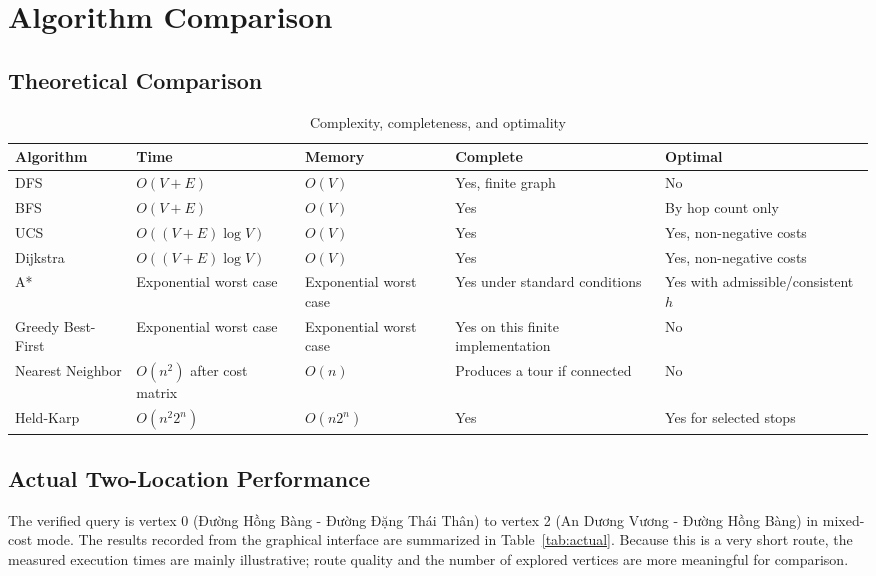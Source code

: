 \documentclass[12pt,a4paper,oneside]{report}
\begin{document}
\chapter{Algorithm Comparison}

\section{Theoretical Comparison}
\begin{table}[H]
\centering
\caption{Complexity, completeness, and optimality}
\label{tab:theory-comparison}
\small
\begin{tabularx}{\textwidth}{p{3.1cm}p{3.3cm}p{2.2cm}p{2cm}X}
\toprule
\textbf{Algorithm} & \textbf{Time} & \textbf{Memory} & \textbf{Complete} & \textbf{Optimal}\\
\midrule
DFS & $O(V+E)$ & $O(V)$ & Yes, finite graph & No\\
BFS & $O(V+E)$ & $O(V)$ & Yes & By hop count only\\
UCS & $O((V+E)\log V)$ & $O(V)$ & Yes & Yes, non-negative costs\\
Dijkstra & $O((V+E)\log V)$ & $O(V)$ & Yes & Yes, non-negative costs\\
A* & Exponential worst case & Exponential worst case & Yes under standard conditions & Yes with admissible/consistent $h$\\
Greedy Best-First & Exponential worst case & Exponential worst case & Yes on this finite implementation & No\\
Nearest Neighbor & $O(n^2)$ after cost matrix & $O(n)$ & Produces a tour if connected & No\\
Held-Karp & $O(n^2 2^n)$ & $O(n2^n)$ & Yes & Yes for selected stops\\
\bottomrule
\end{tabularx}
\end{table}

\section{Actual Two-Location Performance}
The verified query is vertex 0 (Đường Hồng Bàng - Đường Đặng Thái Thân) to
vertex 2 (An Dương Vương - Đường Hồng Bàng) in mixed-cost mode. The results
recorded from the graphical interface are summarized in Table~\ref{tab:actual}.
Because this is a very short route, the measured execution times are mainly
illustrative; route quality and the number of explored vertices are more
meaningful for comparison.
\end{document}
